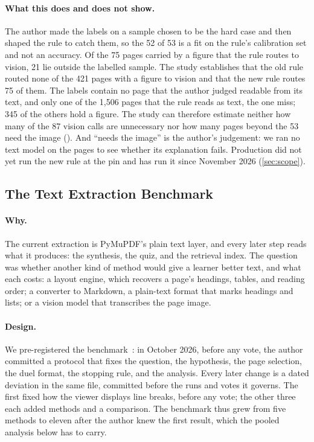 \paragraph{What this does and does not show.} The author made the labels on a
sample chosen to be the hard case and then shaped the rule to catch them, so
the 52 of 53 is a fit on the rule's calibration set and not an accuracy. Of
the 75 pages carried by a figure that the rule routes to vision, 21 lie outside
the labelled sample. The study establishes that the old rule routed none of
the 421 pages with a figure to vision and that the new rule routes 75 of them.
The labels contain no page that the author judged readable from its text,
and only one of the 1{,}506 pages that the rule reads as text, the one miss;
345 of the others hold a figure. The study can therefore estimate neither how
many of the 87 vision calls are unnecessary nor how many pages beyond the 53
need the image (). And \enquote{needs
the image} is the author's judgement: we ran no text model on the pages to see
whether its explanation fails. Production did not yet run the new rule at the
pin and has run it since November 2026 (\cref{sec:scope}).

\subsection{The Text Extraction Benchmark}
\label{sec:parser-bench}

\paragraph{Why.} The current extraction is PyMuPDF's plain text layer, and
every later step reads what it produces: the synthesis, the quiz, and the
retrieval index. The question was whether another kind of method would give a
learner better text, and what each costs: a layout engine, which recovers a
page's headings, tables, and reading order; a converter to Markdown, a
plain-text format that marks headings and lists; or a vision model that
transcribes the page image.

\paragraph{Design.} We pre-registered the
benchmark~\cite{nosek2018preregistration}: in October 2026, before any vote,
the author committed a protocol that fixes the question, the hypothesis, the
page selection, the duel format, the stopping rule, and the analysis. Every
later change is a dated deviation in the same file, committed before the runs
and votes it governs. The first fixed how the viewer displays line breaks,
before any vote; the other three each added methods and a comparison. The
benchmark thus grew from five methods to eleven after the author knew the
first result, which the pooled analysis below has to carry.

